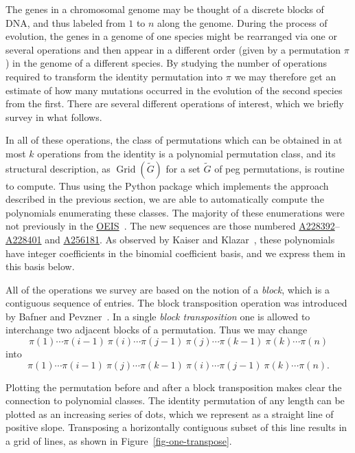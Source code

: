 \documentclass[10pt]{article}
\theoremstyle{plain}
\theoremstyle{definition}
\newcommand{\OEISlink}[1]{\href{http://oeis.org/#1}{#1}}
\newcommand{\OEISref}{\href{http://oeis.org/}{OEIS}~\cite{sloane:the-on-line-enc:}}
\newcommand{\Grid}{\operatorname{Grid}}
\begin{document}
The genes in a chromosomal genome may be thought of a discrete blocks of DNA, and thus labeled from $1$ to $n$ along the genome. During the process of evolution, the genes in a genome of one species might be rearranged via one or several operations and then appear in a different order (given by a permutation $\pi$) in the genome of a different species. By studying the number of operations required to transform the identity permutation into $\pi$ we may therefore get an estimate of how many mutations occurred in the evolution of the second species from the first. There are several different operations of interest, which we briefly survey in what follows.

In all of these operations, the class of permutations which can be obtained in at most $k$ operations from the identity is a polynomial permutation class, and its structural description, as $\Grid(\tilde{G})$ for a set $\tilde{G}$ of peg permutations, is routine to compute. Thus using the Python package which implements the approach described in the previous section, we are able to automatically compute the polynomials enumerating these classes. The majority of these enumerations were not previously in the \OEISref. The new sequences are those numbered \OEISlink{A228392}--\OEISlink{A228401} and \OEISlink{A256181}. As observed by Kaiser and Klazar~\cite{kaiser:on-growth-rates:}, these polynomials have integer coefficients in the binomial coefficient basis, and we express them in this basis below.

All of the operations we survey are based on the notion of a \emph{block}, which is a contiguous sequence of entries. The block transposition operation was introduced by Bafner and Pevzner~\cite{bafna:sorting-by-tran:}. In a single \emph{block transposition} one is allowed to interchange two adjacent blocks of a permutation. Thus we may change
$$
\pi(1)\cdots\pi(i-1)\ \boxed{\pi(i)\cdots\pi(j-1)}\ \boxed{\pi(j)\cdots\pi(k-1)}\ \pi(k)\cdots\pi(n)
$$
into
$$
\pi(1)\cdots\pi(i-1)\ \boxed{\pi(j)\cdots\pi(k-1)}\ \boxed{\pi(i)\cdots\pi(j-1)}\ \pi(k)\cdots\pi(n).
$$

Plotting the permutation before and after a block transposition makes clear the connection to polynomial classes. The identity permutation of any length can be plotted as an increasing series of dots, which we represent as a straight line of positive slope. Transposing a horizontally contiguous subset of this line results in a grid of lines, as shown in Figure~\ref{fig-one-transpose}. 
\end{document}
